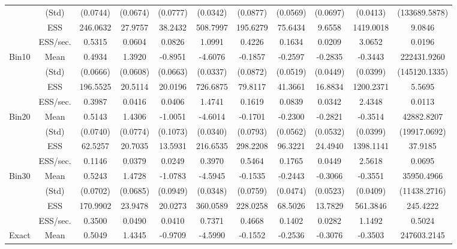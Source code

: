 {{\begin{table}
\begin{tabular}{cc ccc ccc ccc}
 & (Std) 
 & (0.0744)  & (0.0674)  & (0.0777)  & (0.0342)  & (0.0877)  & (0.0569)  & (0.0697)  & (0.0413)  & (133689.5878)  \\  [0.75ex] 
 & ESS 
 & 246.0632  & 27.9757  & 38.2432  & 508.7997  & 195.6279  & 75.6434  & 9.6558  & 1419.0018  & 9.0846  \\  [0.75ex] 
[462.93 s]  & ESS/sec. 
 & 0.5315  & 0.0604  & 0.0826  & 1.0991  & 0.4226  & 0.1634  & 0.0209  & 3.0652  & 0.0196  \\  [1.3ex] 
Bin10 & Mean 
 & 0.4934  & 1.3920  & -0.8951  & -4.6076  & -0.1857  & -0.2597  & -0.2835  & -0.3443  & 222431.9260  \\  [0.75ex] 
 & (Std) 
 & (0.0666)  & (0.0608)  & (0.0663)  & (0.0337)  & (0.0872)  & (0.0519)  & (0.0449)  & (0.0399)  & (145120.1335)  \\  [0.75ex] 
 & ESS 
 & 196.5525  & 20.5114  & 20.0196  & 726.6875  & 79.8117  & 41.3661  & 16.8834  & 1200.2371  & 5.5695  \\  [0.75ex] 
[492.96 s]  & ESS/sec. 
 & 0.3987  & 0.0416  & 0.0406  & 1.4741  & 0.1619  & 0.0839  & 0.0342  & 2.4348  & 0.0113  \\  [1.3ex] 
Bin20 & Mean 
 & 0.5143  & 1.4306  & -1.0051  & -4.6014  & -0.1701  & -0.2300  & -0.2821  & -0.3514  & 42882.8207  \\  [0.75ex] 
 & (Std) 
 & (0.0740)  & (0.0774)  & (0.1073)  & (0.0340)  & (0.0793)  & (0.0562)  & (0.0532)  & (0.0399)  & (19917.0692)  \\  [0.75ex] 
 & ESS 
 & 62.5257  & 20.7035  & 13.5931  & 216.6535  & 298.2208  & 96.3221  & 24.4940  & 1398.1141  & 37.9185  \\  [0.75ex] 
[545.76 s]  & ESS/sec. 
 & 0.1146  & 0.0379  & 0.0249  & 0.3970  & 0.5464  & 0.1765  & 0.0449  & 2.5618  & 0.0695  \\  [1.3ex] 
Bin30 & Mean 
 & 0.5243  & 1.4728  & -1.0783  & -4.5945  & -0.1535  & -0.2443  & -0.3066  & -0.3551  & 35950.4966  \\  [0.75ex] 
 & (Std) 
 & (0.0702)  & (0.0685)  & (0.0949)  & (0.0348)  & (0.0759)  & (0.0474)  & (0.0523)  & (0.0409)  & (11438.2716)  \\  [0.75ex] 
 & ESS 
 & 170.9902  & 23.9478  & 20.0273  & 360.0589  & 228.0258  & 68.5026  & 13.7829  & 561.3846  & 245.4222  \\  [0.75ex] 
[488.48 s]  & ESS/sec. 
 & 0.3500  & 0.0490  & 0.0410  & 0.7371  & 0.4668  & 0.1402  & 0.0282  & 1.1492  & 0.5024  \\  [1.3ex] 
Exact & Mean 
 & 0.5049  & 1.4345  & -0.9709  & -4.5990  & -0.1552  & -0.2536  & -0.3076  & -0.3503  & 247603.2145  \\  [0.75ex] 

\end{tabular}
\end{table}}}
